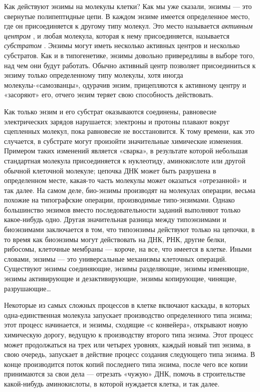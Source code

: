 Как действуют энзимы на молекулы клетки? Как мы уже сказали, энзимы --- это свернутые полипептидные цепи. В каждом энзиме имеется определенное место, где он присоединяется к другому типу молекул. Это место называется \emph{активным центром} , и любая молекула, которая к нему присоединяется, называется \emph{субстратом} . Энзимы могут иметь несколько активных центров и несколько субстратов. Как и в типогенетике, энзимы довольно привередливы в выборе того, над чем они будут работать. Обычно активный центр позволяет присоединиться к энзиму только определенному типу молекулы, хотя иногда молекулы-«самозванцы», одурачив энзим, прицепляются к активному центру и «засоряют» его, отчего энзим теряет свою способность действовать.

Как только энзим и его субстрат оказываются соединены, равновесие электрических зарядов нарушается; электроны и протоны плавают вокруг сцепленных молекул, пока равновесие не восстановится. К тому времени, как это случается, в субстрате могут произойти значительные химические изменения. Примером таких изменений является «сварка», в результате которой небольшая стандартная молекула присоединяется к нуклеотиду, аминокислоте или другой обычной клеточной молекуле; цепочка ДНК может быть разрушена в определенном месте, какая-то часть молекулы может оказаться «отрезанной» и так далее. На самом деле, био-энзимы производят на молекулах операции, весьма похожие на типографские операции, производимые типо-энзимами. Однако большинство энзимов вместо последовательности заданий выполняют только какое-нибудь одно. Другая значительная разница между типоэнзимами и биоэнзимами заключается в том, что типоэнзимы действуют только на цепочки, в то время как биоэнзимы могут действовать на ДНК, РНК, другие белки, рибосомы, клеточные мембраны --- короче, на все, что имеется в клетке. Иными словами, энзимы --- это универсальные механизмы клеточных операций. Существуют энзимы соединяющие, энзимы разделяющие, энзимы изменяющие, энзимы активирующие и дезактивирующие, энзимы копирующие, чинящие, разрушающие\ldots{}

Некоторые из самых сложных процессов в клетке включают каскады, в которых одна-единственная молекула запускает производство определенного типа энзима; этот процесс начинается, и энзимы, сходящие «с конвейера», открывают новую химическую дорогу, ведущую к производству второго типа энзима. Этот процесс может продолжаться на трех или четырех уровнях, каждый новый тип энзима, в свою очередь, запускает в действие процесс создания следующего типа энзима. В конце производится поток копий последнего типа энзима, после чего все копии принимаются за свои дела --- отрезать «чужую» ДНК, помочь в строительстве какой-нибудь аминокислоты, в которой нуждается клетка, и так далее.

